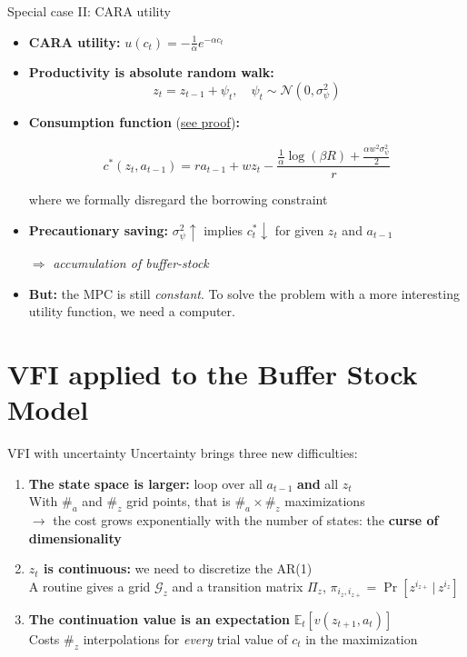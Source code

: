 \documentclass[
  10pt,
  ignorenonframetext,
  aspectratio=43,
  english,
  handout]{beamer}
\providecommand{\tightlist}{%
  \setlength{\itemsep}{0pt}\setlength{\parskip}{0pt}}
\begin{document}
\begin{frame}{Special case II: CARA utility}
\protect{}\label{special-case-ii-cara-utility}
\begin{itemize}
\item
  \textbf{CARA utility:} \(u(c_{t})=-\frac{1}{\alpha}e^{-\alpha c_{t}}\)
\item
  \textbf{Productivity is absolute random walk:} \[
    z_{t}  =z_{t-1}+\psi_{t}, \quad \psi_{t}  \sim\mathcal{N}(0,\sigma^{2}_{\psi})
    \]
\item
  \textbf{Consumption function}
  (\href{https://www.econ2.jhu.edu/people/ccarroll/public/LectureNotes/Consumption/CARAModelWithYRisk/}{see
  proof})\textbf{:}

  \[
    c^{\ast}(z_{t},a_{t-1})=ra_{t-1}+wz_{t}-\frac{\frac{1}{\alpha}\log\left(\beta R\right)+\frac{\alpha w^{2}\sigma^{2}_{\psi}}{2}}{r}
    \]

  where we formally disregard the borrowing constraint
\item
  \textbf{Precautionary saving:} \(\sigma^{2}_{\psi}\uparrow\) implies
  \(c^{\ast}_{t}\downarrow\) for given \(z_{t}\) and \(a_{t-1}\)

  \(\Rightarrow\) \emph{accumulation of buffer-stock}
\item
  \textbf{But:} the MPC is still \emph{constant}. To solve the problem
  with a more interesting utility function, we need a computer.
\end{itemize}
\end{frame}

\section{VFI applied to the Buffer Stock
Model}\label{vfi-applied-to-the-buffer-stock-model}

\begin{frame}{VFI with uncertainty}
\protect{}\label{vfi-with-uncertainty}
Uncertainty brings three new difficulties:

\begin{enumerate}
\tightlist
\item
  \textbf{The state space is larger:} loop over all \(a_{t-1}\)
  \textbf{and} all \(z_t\) \pause\\
  With \(\#_{a}\) and \(\#_{z}\) grid points, that is
  \(\#_{a}\times \#_{z}\) maximizations\\
  \(\to\) the cost grows exponentially with the number of states: the
  \textbf{curse of dimensionality} \pause
\item
  \textbf{\(z_t\) is continuous:} we need to discretize the AR(1)
  \pause\\
  A routine gives a grid \(\mathcal{G}_{z}\) and a transition matrix
  \(\Pi_{z}\), \(\pi_{i_{z},i_{z+}}=\Pr[z^{i_{z+}}\,|\,z^{i_{z}}]\)
  \pause
\item
  \textbf{The continuation value is an expectation}
  \(\mathbb{E}_{t}\left[v(z_{t+1},a_{t})\right]\) \pause\\
  Costs \(\#_{z}\) interpolations for \emph{every} trial value of
  \(c_t\) in the maximization
\end{enumerate}
\end{frame}
\end{document}
